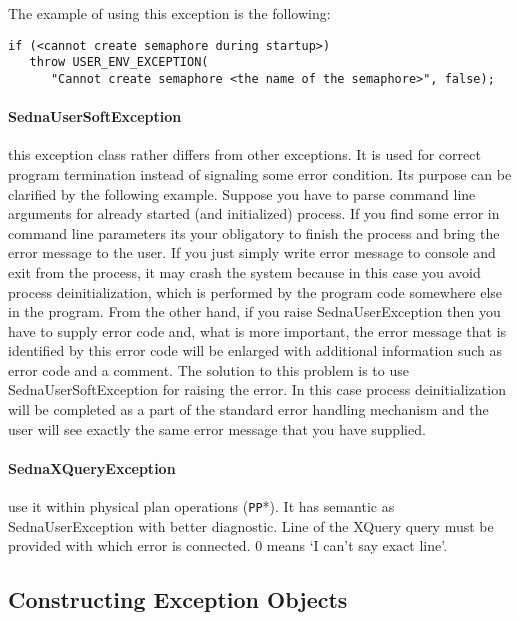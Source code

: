 \documentclass{article}
\begin{document}
The example of using this exception is the following:

\smallskip\noindent
\begin{boxedminipage}{\textwidth}
\begin{verbatim}
if (<cannot create semaphore during startup>)
   throw USER_ENV_EXCEPTION(
      "Cannot create semaphore <the name of the semaphore>", false);
\end{verbatim}
\end{boxedminipage}

\paragraph{SednaUserSoftException} this exception class rather differs from other 
exceptions. It is used for correct program termination instead of signaling
some error condition. Its purpose can be clarified by the following example.
Suppose you have to parse command line arguments for already started (and 
initialized) process. If you find some error in command line parameters its your
obligatory to finish the process and bring the error message to the user. If you
just simply write error message to console and exit from the process, it may
crash the system because in this case you avoid process deinitialization, which
is performed by the program code somewhere else in the program. From the other
hand, if you raise SednaUserException then you have to supply error code and,
what is more important, the error message that is identified by this error
code will be enlarged with additional information such as error code and a 
comment. The solution to this problem is to use SednaUserSoftException for raising
the error. In this case process deinitialization will be completed as a part
of the standard error handling mechanism and the user will see exactly the same
error message that you have supplied.

\paragraph{SednaXQueryException} use it within physical plan operations (\texttt{PP}*). It has 
semantic as SednaUserException with better diagnostic. Line of the XQuery query
must be provided with which error is connected. 0 means `I can't say exact line'.

\subsection{Constructing Exception Objects}
\end{document}
